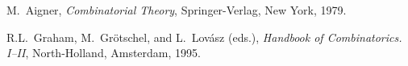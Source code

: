 \documentclass[a4paper]{article}
\begin{document}
\newpage
\begin{thebibliography}{9}

 M.~Aigner,
{\sl Combinatorial Theory}, Springer-Verlag, New York, 1979.










 R.L.~Graham, M.~Gr\"otschel, and L.~Lov\'asz (eds.),
{\sl Handbook of Combinatorics. I--II}, North-Holland, Amsterdam, 1995.






\end{thebibliography}
\end{document}
